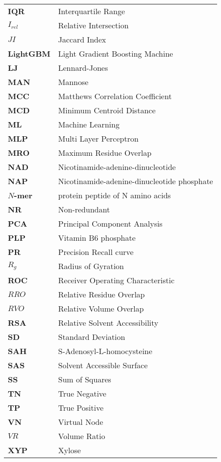 \begin{longtable}[l]{@{}p{2.5cm}p{12cm}@{}}
\textbf{IQR} & Interquartile Range \\
\textbf{$I_{rel}$} & Relative Intersection \\
\textbf{$JI$} & Jaccard Index \\
\textbf{LightGBM} & Light Gradient Boosting Machine \\
\textbf{LJ} & Lennard-Jones \\
\textbf{MAN} & Mannose \\
\textbf{MCC} & Matthews Correlation Coefficient \\
\textbf{MCD} & Minimum Centroid Distance \\
\textbf{ML} & Machine Learning \\
\textbf{MLP} & Multi Layer Perceptron \\
\textbf{MRO} & Maximum Residue Overlap \\
\textbf{NAD} & Nicotinamide-adenine-dinucleotide \\
\textbf{NAP} & Nicotinamide-adenine-dinucleotide phosphate \\
\textbf{$N$-mer} & protein peptide of N amino acids \\
\textbf{NR} & Non-redundant \\
\textbf{PCA} & Principal Component Analysis \\
\textbf{PLP} & Vitamin B6 phosphate \\
\textbf{PR} & Precision Recall curve \\
\textbf{$R_{g}$} & Radius of Gyration \\
\textbf{ROC} & Receiver Operating Characteristic \\
\textbf{$RRO$} & Relative Residue Overlap \\
\textbf{$RVO$} & Relative Volume Overlap \\
\textbf{RSA} & Relative Solvent Accessibility \\
\textbf{SD} & Standard Deviation \\
\textbf{SAH} & S-Adenosyl-L-homocysteine \\
\textbf{SAS} & Solvent Accessible Surface \\
\textbf{SS} & Sum of Squares \\
\textbf{TN} & True Negative \\
\textbf{TP} & True Positive \\
\textbf{VN} & Virtual Node \\
\textbf{$VR$} & Volume Ratio \\
\textbf{XYP} & Xylose \\

\end{longtable}
